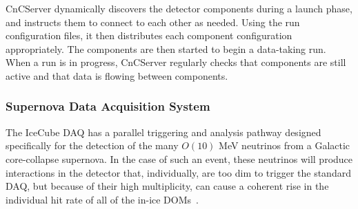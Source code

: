 CnCServer dynamically discovers the detector components during a launch
phase, and instructs them to connect to each other as needed.  Using the
run configuration files, it then distributes each component configuration
appropriately.  The components are then started to begin a data-taking run.
When a run is in progress, CnCServer regularly checks that components are
still active and that data is flowing between components.




\subsubsection{\label{sect:SNDAQ}Supernova Data Acquisition System}

The IceCube DAQ has a parallel triggering and analysis pathway designed
specifically for the detection of the many $O(10)$ MeV neutrinos from a
Galactic core-collapse supernova.  In the case of such an event, these
neutrinos will produce interactions in
the detector that, individually, are too dim to trigger the standard DAQ,
but because of their high multiplicity, can cause a coherent rise in the
individual hit rate of all of the in-ice DOMs~\cite{IC3:supernova}.

